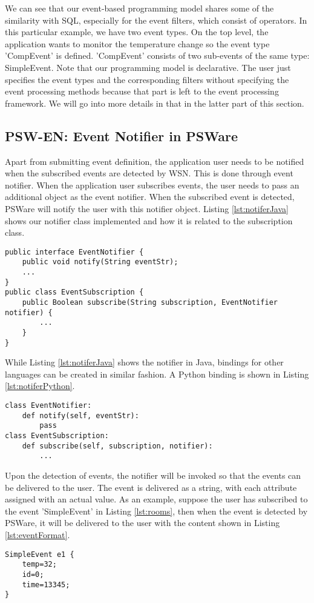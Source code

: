 We can see that our event-based programming model shares some of the similarity with SQL, especially for the event filters, which consist of operators. In this particular example, we have two event types. On the top level, the application wants to monitor the temperature change so the event type 'CompEvent' is defined. 'CompEvent' consists of two sub-events of the same type: SimpleEvent. Note that our programming model is declarative. The user just specifies the event types and the corresponding filters without specifying the event processing methods because that part is left to the event processing framework. We will go into more details in that in the latter part of this section.

\subsection{PSW-EN: Event Notifier in PSWare}
Apart from submitting event definition, the application user needs to be notified when the subscribed events are detected by WSN. This is done through event notifier. When the application user subscribes events, the user needs to pass an additional object as the event notifier. When the subscribed event is detected, PSWare will notify the user with this notifier object. Listing \ref{lst:notiferJava} shows our notifier class implemented and how it is related to the subscription class.

\begin{lstlisting}[caption=Event notifier in Java, label=lst:notiferJava]
public interface EventNotifier {
	public void notify(String eventStr);
	...
}
public class EventSubscription {
	public Boolean subscribe(String subscription, EventNotifier notifier) {
		...
	}
}
\end{lstlisting}

While Listing \ref{lst:notiferJava} shows the notifier in Java, bindings for other languages can be created in similar fashion. A Python binding is shown in Listing \ref{lst:notiferPython}.
\begin{lstlisting}[caption=Python binding of event notifier, label=lst:notiferPython]
class EventNotifier:
	def notify(self, eventStr):
		pass
class EventSubscription:
	def subscribe(self, subscription, notifier):
		...
\end{lstlisting}

Upon the detection of events, the notifier will be invoked so that the events can be delivered to the user. The event is delivered as a string, with each attribute assigned with an actual value. As an example, suppose the user has subscribed to the event 'SimpleEvent' in Listing \ref{lst:rooms}, then when the event is detected by PSWare, it will be delivered to the user with the content shown in Listing \ref{lst:eventFormat}.
\begin{lstlisting}[caption=Received event from notifier, label=lst:eventFormat]
SimpleEvent e1 {
	temp=32;
	id=0;
	time=13345;
}
\end{lstlisting}

